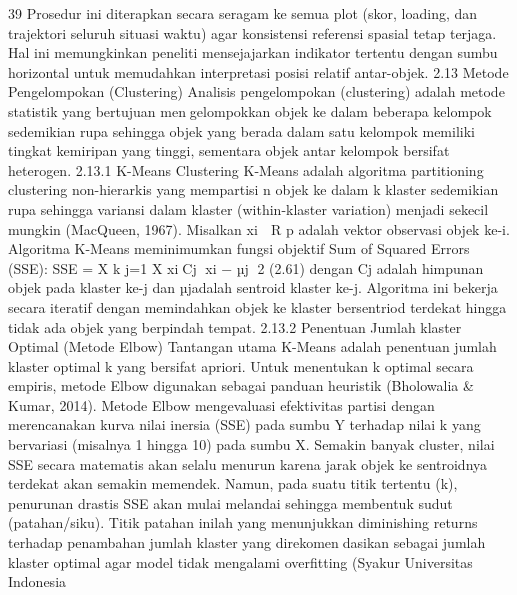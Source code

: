 39
Prosedur ini diterapkan secara seragam ke semua plot (skor, loading, dan trajektori seluruh
situasi waktu) agar konsistensi referensi spasial tetap terjaga. Hal ini memungkinkan
peneliti mensejajarkan indikator tertentu dengan sumbu horizontal untuk memudahkan
interpretasi posisi relatif antar-objek.
2.13 Metode Pengelompokan (Clustering)
Analisis pengelompokan (clustering) adalah metode statistik yang bertujuan mengelompokkan objek ke dalam beberapa kelompok sedemikian rupa sehingga objek yang
berada dalam satu kelompok memiliki tingkat kemiripan yang tinggi, sementara objek
antar kelompok bersifat heterogen.
2.13.1 K-Means Clustering
K-Means adalah algoritma partitioning clustering non-hierarkis yang mempartisi n
objek ke dalam k klaster sedemikian rupa sehingga variansi dalam klaster (within-klaster
variation) menjadi sekecil mungkin (MacQueen, 1967). Misalkan xi ∈ R
p
adalah vektor
observasi objek ke-i. Algoritma K-Means meminimumkan fungsi objektif Sum of Squared
Errors (SSE):
SSE =
X
k
j=1
X
xi∈Cj
∥xi − µj∥
2
(2.61)
dengan Cj adalah himpunan objek pada klaster ke-j dan µjadalah sentroid klaster ke-j.
Algoritma ini bekerja secara iteratif dengan memindahkan objek ke klaster bersentriod
terdekat hingga tidak ada objek yang berpindah tempat.
2.13.2 Penentuan Jumlah klaster Optimal (Metode Elbow)
Tantangan utama K-Means adalah penentuan jumlah klaster optimal k yang bersifat
apriori. Untuk menentukan k optimal secara empiris, metode Elbow digunakan sebagai
panduan heuristik (Bholowalia & Kumar, 2014). Metode Elbow mengevaluasi efektivitas
partisi dengan merencanakan kurva nilai inersia (SSE) pada sumbu Y terhadap nilai k
yang bervariasi (misalnya 1 hingga 10) pada sumbu X. Semakin banyak cluster, nilai
SSE secara matematis akan selalu menurun karena jarak objek ke sentroidnya terdekat
akan semakin memendek. Namun, pada suatu titik tertentu (k), penurunan drastis SSE
akan mulai melandai sehingga membentuk sudut (patahan/siku). Titik patahan inilah yang
menunjukkan diminishing returns terhadap penambahan jumlah klaster yang direkomendasikan sebagai jumlah klaster optimal agar model tidak mengalami overfitting (Syakur
Universitas Indonesia

